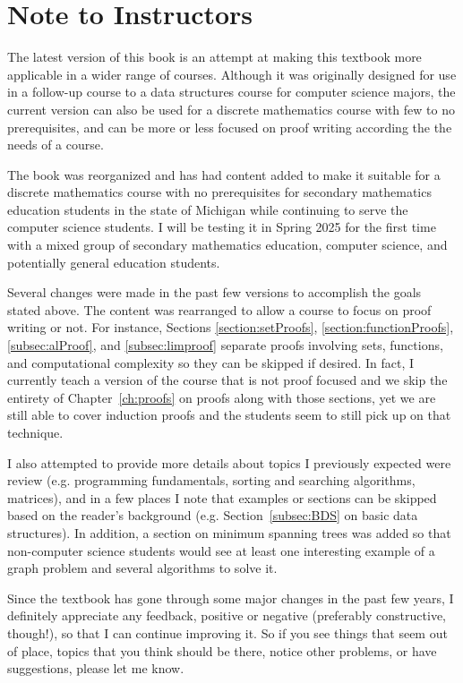 \chapter*{Note to Instructors}

The latest version of this book is an attempt at making this textbook
more applicable in a wider range of courses. 
Although it was originally designed for use in a follow-up course 
to a data structures course for computer science majors,
the current version can also be used for a discrete mathematics
course with few to no prerequisites, and can be more or less focused
on proof writing according the the needs of a course.

The book was 
reorganized and has had content added to make it suitable for
a discrete mathematics course with no prerequisites for 
secondary mathematics education students in the state of Michigan
while continuing to serve the computer science students. 
I will be testing it in Spring 2025 for the first time with a mixed group
of secondary mathematics education, computer science, 
and potentially general education students.

Several changes were made in the past few versions to accomplish the
goals stated above.
The content was rearranged to allow a course 
to focus on proof writing or not. 
For instance, 
Sections \ref{section:setProofs}, 
\ref{section:functionProofs}, 
\ref{subsec:alProof}, 
and
\ref{subsec:limproof}
separate proofs involving
sets, functions, and computational complexity so they can be skipped if desired.
In fact, I currently teach a version of the course that is
not proof focused and we skip the entirety of Chapter~\ref{ch:proofs} 
on proofs along with those sections, yet we are still able to cover
induction proofs and the students seem to still pick up on that technique.

I also attempted to provide more details 
about topics I previously expected were review 
(e.g. programming fundamentals, sorting and searching algorithms, matrices),
and in a few places I note 
that examples or sections can be skipped based on 
the reader's background 
(e.g. Section~\ref{subsec:BDS} on basic data structures).
In addition, a section on minimum spanning trees 
was added so that non-computer science students would see 
at least one interesting example of a graph problem and
several algorithms to solve it.

Since the textbook has gone through some major changes in the past
few years, I definitely appreciate any feedback, positive or negative
(preferably constructive, though!), so that I can continue 
improving it. So if you see things that seem out of place, 
topics that you think should be there,
notice other problems, or have suggestions, please let me know.

